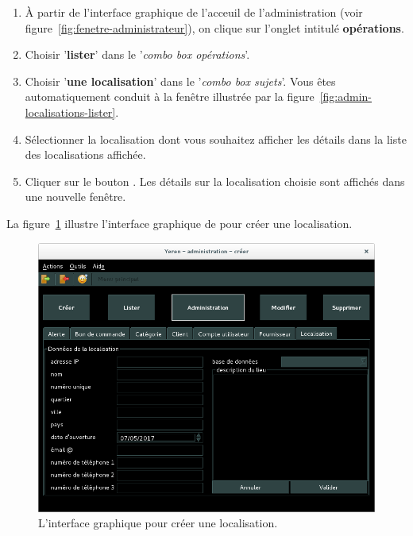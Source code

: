 \begin{enumerate}[1)]
	\item \`A partir de l'interface graphique de l'acceuil de
		l'administration (voir figure~\ref{fig:fenetre-administrateur}),
		on clique sur l'onglet intitul\'e \textbf{op\'erations}. 
		
	\item Choisir '\textbf{lister}' dans le '\emph{combo box
		op\'erations}'.
		
	\item Choisir '\textbf{une localisation}' dans le '\emph{combo box
		sujets}'. Vous \^etes automatiquement conduit \`a la fen\^etre
		illustr\'ee par la figure~\ref{fig:admin-localisations-lister}.
		
	\item S\'electionner la localisation dont vous souhaitez afficher
		les d\'etails dans la liste des localisations affich\'ee.
		
	\item Cliquer sur le bouton . Les d\'etails
		sur la localisation choisie sont affich\'es dans
		une nouvelle fen\^etre.
\end{enumerate}



La figure~\ref{fig:admin-localisations-creer} illustre
l'interface graphique de \yeroth pour cr\'eer une localisation.\\

\begin{figure}[!htpb]
	\centering
	\includegraphics[scale=0.45]{images/localisation-creer.png}
	\caption{L'interface graphique pour cr\'eer une localisation.}
	\label{fig:admin-localisations-creer}
\end{figure}


